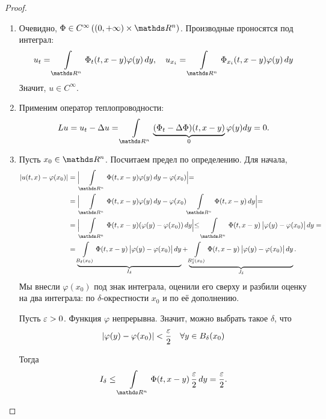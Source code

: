 \begin{proof}
\begin{enumerate} 
\item Очевидно, $\Phi \in  C^\infty\left(\left(0, +\infty\right)\times \real^n\right)$. Производные проносятся под интеграл:
$$u_t = \int\limits_{\real^n} \Phi_t(t,x-y)\varphi(y) \, dy, \quad u_{x_i} = \int\limits_{\real^n} \Phi_{x_i}(t, x-y)\varphi(y) \, dy$$
Значит, $u \in C^\infty.$
\item Применим оператор теплопроводности: $$Lu = u_t - \Delta u = \int\limits_{\real^n} \underbrace{(\Phi_t - \Delta \Phi)(t, x-y)}_{0}\varphi(y) dy = 0.$$
\item Пусть $x_0 \in \real^n$. Посчитаем предел по определению. Для начала,
\begin{align*}
|u(t,x) - \varphi(x_0)| &= \Bigl| \int \limits_{\real^n} \Phi(t, x-y) \varphi(y) \, dy - \varphi(x_0) \Bigl| = \\
	&= \Bigl| \int \limits_{\real^n} \Phi(t, x-y) \varphi(y) \, dy - \varphi(x_0) \int \limits_{\real^n} \Phi(t, x-y) \, dy\Bigl|= \\
	&= \Bigl| \int \limits_{\real^n} \Phi(t, x-y) (\varphi(y) - \varphi(x_0)) \, dy \Bigl| \leq \int \limits_{\real^n} \Phi(t, x-y) \, \bigl| \varphi(y) - \varphi(x_0) \bigl| \, dy = \\
	&= \underbrace {\int \limits_{B_\delta (x_0)} \Phi(t, x-y) \, \bigl| \varphi(y) - \varphi(x_0) \bigl| \, dy}_{I_\delta} + \underbrace {\int \limits_{B^c_\delta (x_0)} \Phi(t, x-y) \, \bigl| \varphi(y) - \varphi(x_0) \bigl| \, dy}_{J_\delta}.
\end{align*}
Мы внесли $\varphi(x_0)$ под знак интеграла, оценили его сверху и разбили оценку на два интеграла: по $\delta$-окрестности $x_0$ и по её дополнению.

Пусть $\varepsilon > 0$. Функция $\varphi$ непрерывна. Значит, можно выбрать такое $\delta$, что 
$$ | \varphi(y) - \varphi(x_0)| < \dfrac {\varepsilon} {2} \quad \forall y \in B_\delta (x_0)$$

Тогда
$$ I_\delta \leq \int \limits_{\real^n} \Phi(t, x-y) \, \frac {\eps} {2} \, dy = \frac {\eps} {2}. $$


\end{enumerate}
\end{proof}
